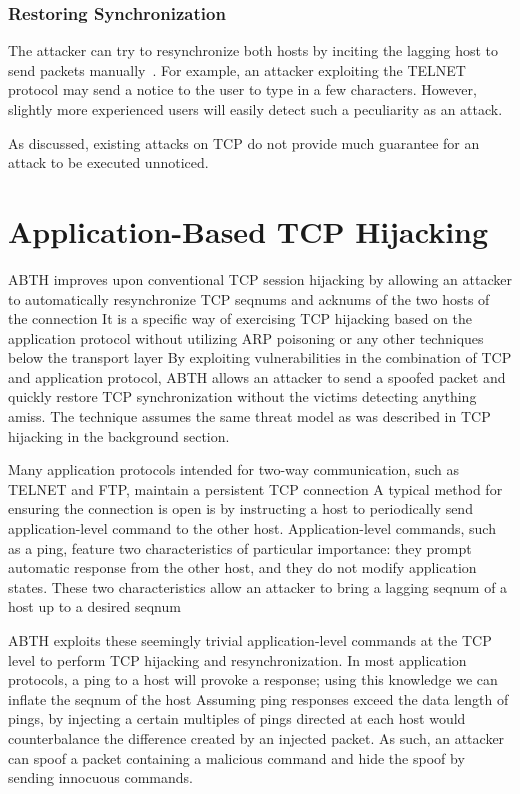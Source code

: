 \documentclass{sig-alternate}
\begin{document}
\subsubsection{Restoring Synchronization}

The attacker can try to resynchronize both hosts by inciting the lagging host to send packets manually~\cite{lam:resync}.
For example, an attacker exploiting the TELNET protocol may send a notice to the user to type in a few characters.
However, slightly more experienced users will easily detect such a peculiarity as an attack.

As discussed, existing attacks on TCP do not provide much guarantee for an attack to be executed unnoticed.

\section{Application-Based TCP Hijacking}

ABTH improves upon conventional TCP session hijacking by allowing an attacker to automatically resynchronize TCP seqnums and acknums of the two hosts of the connection
It is a specific way of exercising TCP hijacking based on the application protocol without utilizing ARP poisoning or any other techniques below the transport layer
By exploiting vulnerabilities in the combination of TCP and application protocol, ABTH allows an attacker to send a spoofed packet and quickly restore TCP synchronization without the victims detecting anything amiss.
The technique assumes the same threat model as was described in TCP hijacking in the background section.

Many application protocols intended for two-way communication, such as TELNET and FTP, maintain a persistent TCP connection
A typical method for ensuring the connection is open is by instructing a host to periodically send application-level command to the other host.
Application-level commands, such as a ping, feature two characteristics of particular importance: they prompt automatic response from the other host, and they do not modify application states.
These two characteristics allow an attacker to bring a lagging seqnum of a host up to a desired seqnum


ABTH exploits these seemingly trivial application-level commands at the TCP level to perform TCP hijacking and resynchronization.
In most application protocols, a ping to a host will provoke a response; using this knowledge we can inflate the seqnum of the host
Assuming ping responses exceed the data length of pings, by injecting a certain multiples of pings directed at each host would counterbalance the difference created by an injected packet.
As such, an attacker can spoof a packet containing a malicious command and hide the spoof by sending innocuous commands.
\end{document}
